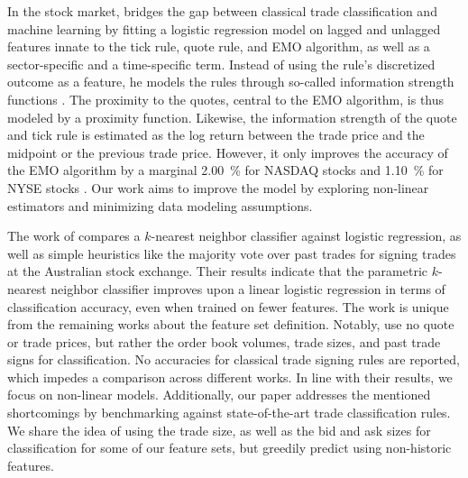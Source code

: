 In the stock market, \textcite[\checkmark][396--398]{rosenthalModelingTradeDirection2012} bridges the gap between classical trade classification and machine learning by fitting a logistic regression model on lagged and unlagged features innate to the tick rule, quote rule, and \gls{EMO} algorithm, as well as a sector-specific and a time-specific term. Instead of using the rule's discretized outcome as a feature, he models the rules through so-called information strength functions \autocite[\checkmark][396--398]{rosenthalModelingTradeDirection2012}. The proximity to the quotes, central to the \gls{EMO} algorithm, is thus modeled by a proximity function. Likewise, the information strength of the quote and tick rule is estimated as the log return between the trade price and the midpoint or the previous trade price. However, it only improves the accuracy of the \gls{EMO} algorithm by a marginal \SI{2.00}{\percent} for \gls{NASDAQ} stocks and \SI{1.10}{\percent} for \gls{NYSE} stocks \autocite[\checkmark][405]{rosenthalModelingTradeDirection2012}. Our work aims to improve the model by exploring non-linear estimators and minimizing data modeling assumptions.

The work of \textcite[\checkmark][483]{blazejewskiLocalNonParametricModel2005} compares a $k$-nearest neighbor classifier against logistic regression, as well as simple heuristics like the majority vote over past trades for signing trades at the Australian stock exchange. Their results indicate that the parametric $k$-nearest neighbor classifier improves upon a linear logistic regression in terms of classification accuracy, even when trained on fewer features. The work is unique from the remaining works about the feature set definition. Notably, \textcite[\checkmark][483]{blazejewskiLocalNonParametricModel2005} use no quote or trade prices, but rather the order book volumes, trade sizes, and past trade signs for classification. No accuracies for classical trade signing rules are reported, which impedes a comparison across different works. In line with their results, we focus on non-linear models. Additionally, our paper addresses the mentioned shortcomings by benchmarking against state-of-the-art trade classification rules. We share the idea of using the trade size, as well as the bid and ask sizes for classification for some of our feature sets, but greedily predict using non-historic features.

